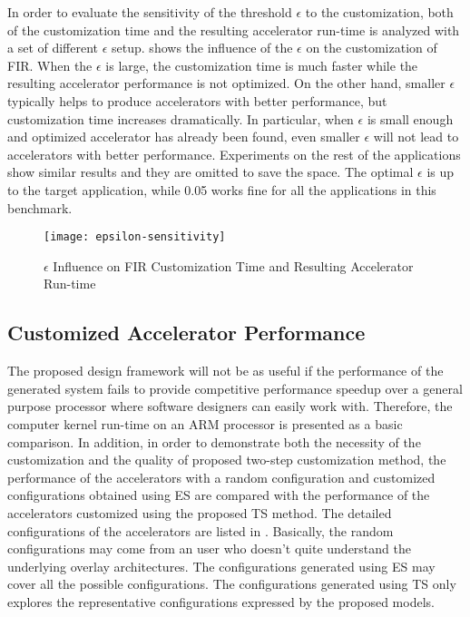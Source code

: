 In order to evaluate the sensitivity of the threshold $\epsilon$ to the customization, both of the customization time and the resulting accelerator run-time is analyzed with a set of different $\epsilon$ setup.  shows the influence of the $\epsilon$ on the customization of FIR. When the $\epsilon$ is large, the customization time is much faster while the resulting accelerator performance is not optimized. On the other hand, smaller $\epsilon$ typically helps to produce accelerators with better performance, but customization time increases dramatically. In particular, when $\epsilon$ is small enough and optimized accelerator has already been found, even smaller $\epsilon$ will not lead to accelerators with better performance. Experiments on the rest of the applications show similar results and they are omitted to save the space. The optimal $\epsilon$ is up to the target application, while 0.05 works fine for all the applications in this benchmark.

\begin{figure}[htb]
    \centering
    \texttt{[image: epsilon-sensitivity]}
    \caption{$\epsilon$ Influence on FIR Customization Time and Resulting Accelerator Run-time}
    \label{fig:epsilon-sensitivity}
\end{figure}
 
\subsection{Customized Accelerator Performance}
The proposed design framework will not be as useful if the performance of the generated system fails to provide competitive performance speedup over a general purpose processor where software designers can easily work with. Therefore, the computer kernel run-time on an ARM processor is presented as a basic comparison. In addition, in order to demonstrate both the necessity of the customization and the quality of proposed two-step customization method, the performance of the accelerators with a random configuration and customized configurations obtained using ES are compared with the performance of the accelerators customized using the proposed TS method. The detailed configurations of the accelerators are listed in . Basically, the random configurations may come from an user who doesn't quite understand the underlying overlay architectures. The configurations generated using ES may cover all the possible configurations. The configurations generated using TS only explores the representative configurations expressed by the proposed models.

